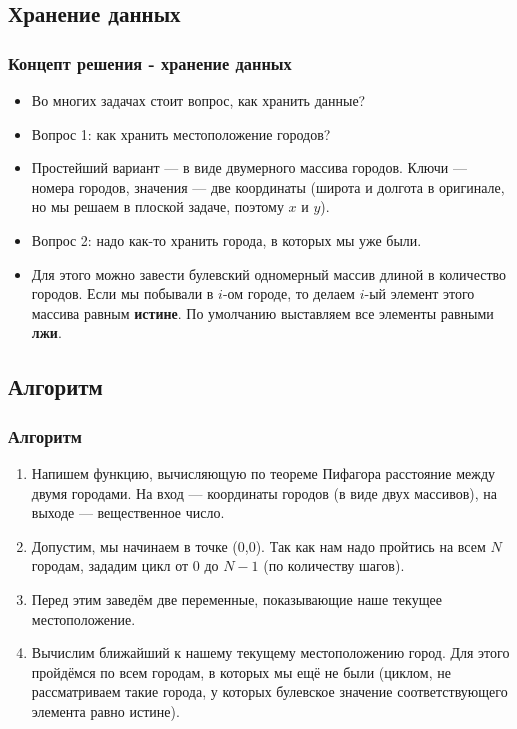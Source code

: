 \documentclass[compress,red]{beamer}
\begin{document}
\subsection{Хранение данных}
\begin{frame}[fragile]
  \frametitle{Концепт решения - хранение данных}
	\begin{itemize}
		\item Во многих задачах стоит вопрос, как хранить данные?
		\item Вопрос 1: как хранить местоположение городов?
		\item Простейший вариант --- в виде двумерного массива городов. Ключи --- номера городов, значения --- две координаты (широта и долгота в оригинале, но мы решаем в плоской задаче, поэтому $x$ и $y$).
		\item Вопрос 2: надо как-то хранить города, в которых мы уже были.
		\item Для этого можно завести булевский одномерный массив длиной в количество городов. Если мы побывали в $i$-ом городе, то делаем $i$-ый элемент этого массива равным \textbf{истине}. По умолчанию выставляем все элементы равными \textbf{лжи}.
	\end{itemize}
\end{frame}

\subsection{Алгоритм}
\begin{frame}[fragile]
  \frametitle{Алгоритм}
	\begin{enumerate}
		\item Напишем функцию, вычисляющую по теореме Пифагора расстояние между двумя городами. На вход --- координаты городов (в виде двух массивов), на выходе --- вещественное число.
		\item Допустим, мы начинаем в точке (0,0). Так как нам надо пройтись на всем $N$ городам, зададим цикл от 0 до $N-1$ (по количеству шагов).
		\item Перед этим заведём две переменные, показывающие наше текущее местоположение.
		\item Вычислим ближайший к нашему текущему местоположению город. Для этого пройдёмся по всем городам, в которых мы ещё не были (циклом, не рассматриваем такие города, у которых булевское значение соответствующего элемента равно истине).
 	\end{enumerate}
\end{frame}
\end{document}

